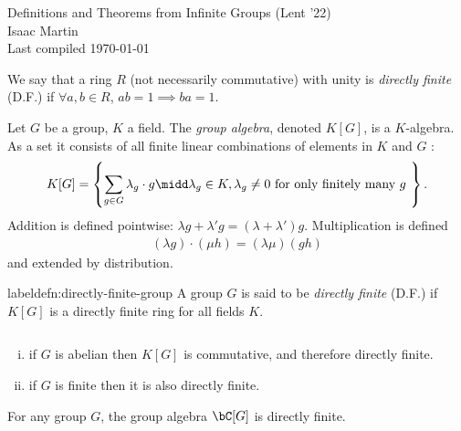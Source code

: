 


\pagestyle{empty}
	\LARGE
\begin{center}
	Definitions and Theorems from Infinite Groups (Lent '22) \\
	\Large
	Isaac Martin \\
    Last compiled \today
\end{center}
\normalsize
\vspace{-2mm}
\hru
{}
\begin{defn}\label{defn:directly-finite-ring}
	We say that a ring $R$ (not necessarily commutative) with unity is \emph{directly finite} (D.F.) if $\forall a,b \in R$, $ab = 1 \implies ba = 1$. 
\end{defn}

\begin{defn}\label{defn:group-alg}
	Let $G$ be a group, $K$ a field. The \emph{group algebra}, denoted $K[G]$, is a $K$-algebra. As a set it consists of all finite linear combinations of elements in $K$ and $G$ :
	\begin{align*}
		K[G] = \left\{\sum_{g\in G}\lambda_g \cdot g \midd \lambda_g \in K, \lambda_g \neq 0 \text{ for only finitely many $g$ }\right\}.
	\end{align*}
	Addition is defined pointwise: $\lambda g + \lambda' g = (\lambda+\lambda')g$. Multiplication is defined
	\begin{align*}
		(\lambda g)\cdot (\mu h) = (\lambda \mu)(gh)
	\end{align*}
	and extended by distribution.
\end{defn}

\begin{defn}label{defn:directly-finite-group}
	A group $G$ is said to be \emph{directly finite} (D.F.) if $K[G]$ is a directly finite ring for all fields $K$.
\end{defn}

\begin{example}\label{ex:directly-finite-group}$ $
	\begin{enumerate}[(i)]
		\item  if $G$ is abelian then $K[G]$ is commutative, and therefore directly finite.
		\item if $G$ is finite then it is also directly finite.
	\end{enumerate}
\end{example}

\begin{thm}[Kaplansky]\label{thm:grp-alg-over-C-DF}
	For any group $G$, the group algebra $\bC[G]$ is directly finite.
\end{thm}

